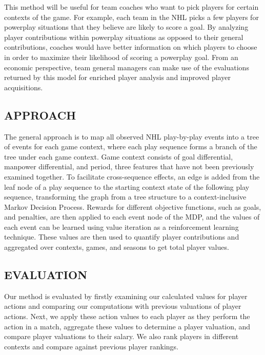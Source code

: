 \documentclass[]{article}
\begin{document}
This method will be useful for team coaches who want to pick players for certain contexts of the game. For example, each team in the NHL picks a few players for powerplay situations that they believe are likely to score a goal. By analyzing player contributions within powerplay situations as opposed to their general contributions, coaches would have better information on which players to choose in order to maximize their likelihood of scoring a powerplay goal. From an economic perspective, team general managers can make use of the evaluations returned by this model for enriched player analysis and improved player acquisitions.


\subsection{APPROACH}

The general approach is to map all observed NHL play-by-play events into a tree of events for each game context, where each play sequence forms a branch of the tree under each game context. Game context consists of goal differential, manpower differential, and period, three features that have not been previously examined together. To facilitate cross-sequence effects, an edge is added from the leaf node of a play sequence to the starting context state of the following play sequence, transforming the graph from a tree structure to a context-inclusive Markov Decision Process. Rewards for different objective functions, such as goals, and penalties, are then applied to each event node of the MDP, and the values of each event can be learned using value iteration as a reinforcement learning technique. These values are then used to quantify player contributions and aggregated over contexts, games, and seasons to get total player values.


\subsection{EVALUATION}

Our method is evaluated by firstly examining our calculated values for player actions and comparing our computations with previous valuations of player actions.  Next, we apply these action values to each player as they perform the action in a match, aggregate these values to determine a player valuation, and compare player valuations to their salary. We also rank players in different contexts and compare against previous player rankings.
\end{document}
